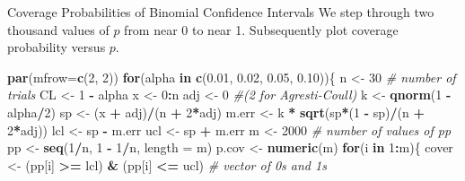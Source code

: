 \documentclass[
  ignorenonframetext,
]{beamer}
\newenvironment{Shaded}{\begin{snugshade}}{\end{snugshade}}
\newcommand{\AttributeTok}[1]{\textcolor[rgb]{0.13,0.29,0.53}{#1}}
\newcommand{\CommentTok}[1]{\textcolor[rgb]{0.56,0.35,0.01}{\textit{#1}}}
\newcommand{\ControlFlowTok}[1]{\textcolor[rgb]{0.13,0.29,0.53}{\textbf{#1}}}
\newcommand{\DecValTok}[1]{\textcolor[rgb]{0.00,0.00,0.81}{#1}}
\newcommand{\FloatTok}[1]{\textcolor[rgb]{0.00,0.00,0.81}{#1}}
\newcommand{\FunctionTok}[1]{\textcolor[rgb]{0.13,0.29,0.53}{\textbf{#1}}}
\newcommand{\NormalTok}[1]{#1}
\newcommand{\OtherTok}[1]{\textcolor[rgb]{0.56,0.35,0.01}{#1}}
\newcommand{\SpecialCharTok}[1]{\textcolor[rgb]{0.81,0.36,0.00}{\textbf{#1}}}
\begin{document}
\begin{frame}[fragile]{Coverage Probabilities of Binomial Confidence
Intervals}
\protect\hypertarget{coverage-probabilities-of-binomial-confidence-intervals-5}{}
We step through two thousand values of \(p\) from near 0 to near 1.
Subsequently plot coverage probability versus \(p\).

\tiny

\begin{Shaded}
\begin{Highlighting}[]
\FunctionTok{par}\NormalTok{(}\AttributeTok{mfrow=}\FunctionTok{c}\NormalTok{(}\DecValTok{2}\NormalTok{, }\DecValTok{2}\NormalTok{))}
\ControlFlowTok{for}\NormalTok{(alpha }\ControlFlowTok{in} \FunctionTok{c}\NormalTok{(}\FloatTok{0.01}\NormalTok{, }\FloatTok{0.02}\NormalTok{, }\FloatTok{0.05}\NormalTok{, }\FloatTok{0.10}\NormalTok{))\{}
\NormalTok{n }\OtherTok{\textless{}{-}} \DecValTok{30}     \CommentTok{\# number of trials}
\NormalTok{CL }\OtherTok{\textless{}{-}} \DecValTok{1} \SpecialCharTok{{-}}\NormalTok{ alpha}
\NormalTok{x }\OtherTok{\textless{}{-}} \DecValTok{0}\SpecialCharTok{:}\NormalTok{n }
\NormalTok{adj }\OtherTok{\textless{}{-}} \DecValTok{0}    \CommentTok{\#(2 for Agresti{-}Coull)}
\NormalTok{k }\OtherTok{\textless{}{-}} \FunctionTok{qnorm}\NormalTok{(}\DecValTok{1} \SpecialCharTok{{-}}\NormalTok{ alpha}\SpecialCharTok{/}\DecValTok{2}\NormalTok{)}
\NormalTok{sp }\OtherTok{\textless{}{-}}\NormalTok{ (x }\SpecialCharTok{+}\NormalTok{ adj)}\SpecialCharTok{/}\NormalTok{(n }\SpecialCharTok{+} \DecValTok{2}\SpecialCharTok{*}\NormalTok{adj)}
\NormalTok{m.err }\OtherTok{\textless{}{-}}\NormalTok{ k }\SpecialCharTok{*} \FunctionTok{sqrt}\NormalTok{(sp}\SpecialCharTok{*}\NormalTok{(}\DecValTok{1} \SpecialCharTok{{-}}\NormalTok{ sp)}\SpecialCharTok{/}\NormalTok{(n }\SpecialCharTok{+} \DecValTok{2}\SpecialCharTok{*}\NormalTok{adj))}
\NormalTok{lcl }\OtherTok{\textless{}{-}}\NormalTok{ sp }\SpecialCharTok{{-}}\NormalTok{ m.err}
\NormalTok{ucl }\OtherTok{\textless{}{-}}\NormalTok{ sp }\SpecialCharTok{+}\NormalTok{ m.err}
\NormalTok{m }\OtherTok{\textless{}{-}} \DecValTok{2000} \CommentTok{\# number of values of pp}
\NormalTok{pp }\OtherTok{\textless{}{-}} \FunctionTok{seq}\NormalTok{(}\DecValTok{1}\SpecialCharTok{/}\NormalTok{n, }\DecValTok{1} \SpecialCharTok{{-}} \DecValTok{1}\SpecialCharTok{/}\NormalTok{n, }\AttributeTok{length =}\NormalTok{ m)}
\NormalTok{p.cov }\OtherTok{\textless{}{-}} \FunctionTok{numeric}\NormalTok{(m)}
\ControlFlowTok{for}\NormalTok{(i }\ControlFlowTok{in} \DecValTok{1}\SpecialCharTok{:}\NormalTok{m)\{}
\NormalTok{  cover }\OtherTok{\textless{}{-}}\NormalTok{ (pp[i] }\SpecialCharTok{\textgreater{}=}\NormalTok{ lcl) }\SpecialCharTok{\&}\NormalTok{ (pp[i] }\SpecialCharTok{\textless{}=}\NormalTok{ ucl)  }\CommentTok{\# vector of 0s and 1s}

\end{Highlighting}
\end{Shaded}
\end{frame}
\end{document}
